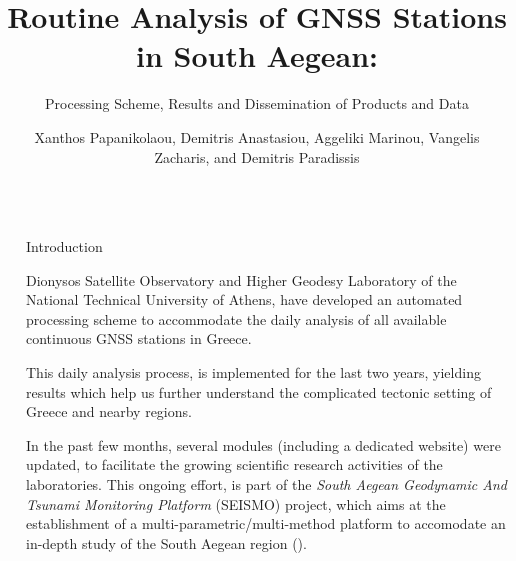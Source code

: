 \documentclass[final,a0,portrait]{beamer}
\title{Routine Analysis of GNSS Stations in South Aegean:} %
\subtitle{Processing Scheme, Results and Dissemination of Products and Data}
\author{Xanthos Papanikolaou, Demitris Anastasiou, Aggeliki Marinou, Vangelis Zacharis, and Demitris Paradissis} %
\institute{National Technical University of Athens, School of Rural and Surveying Engineering} %
\newlength{\sepwid}
\newlength{\onecolwid}
\begin{document}

\setlength{\belowcaptionskip}{2ex} %
\setlength\belowdisplayshortskip{2ex} %

\begin{frame}[t] %

\begin{columns}[t] %

\begin{column}{\sepwid}\end{column} %

\begin{column}{\onecolwid} %


\begin{block}{Introduction}
{\small
Dionysos Satellite Observatory and Higher Geodesy Laboratory of the National Technical University of Athens, have developed 
an automated processing scheme to accommodate the daily analysis of all available continuous GNSS stations in Greece.

This daily analysis process, is implemented for the last two years, yielding results which help us further understand the 
complicated tectonic setting of Greece and nearby regions.

In the past few months, several modules (including a dedicated website) were updated, to facilitate the growing scientific research 
activities of the laboratories. This ongoing effort, is part of the \emph{South Aegean Geodynamic And Tsunami Monitoring Platform}
(SEISMO) project, which aims at the establishment of a multi-parametric/multi-method platform to accomodate an in-depth study of
the South Aegean region (\cite{dsoseismo}).
}
\end{block}



\end{column}
\end{columns}
\end{frame}
\end{document}
